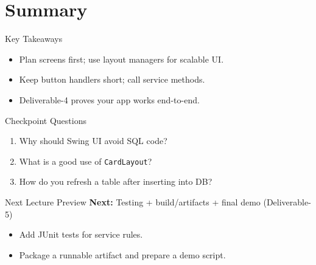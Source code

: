 \documentclass{beamer}
\begin{document}
\section{Summary}
\label{sec:summary}

\begin{frame}{Key Takeaways}
  \begin{itemize}[<+->]
    \item Plan screens first; use layout managers for scalable UI.
    \item Keep button handlers short; call service methods.
    \item Deliverable-4 proves your app works end-to-end.
  \end{itemize}
  \slidesources{\OOPSUnitVISources}
\end{frame}

\begin{frame}{Checkpoint Questions}
  \begin{enumerate}[<+->]
    \item Why should Swing UI avoid SQL code?
    \item What is a good use of \texttt{CardLayout}?
    \item How do you refresh a table after inserting into DB?
  \end{enumerate}
  \slidesources{\OOPSUnitVISources}
\end{frame}

\begin{frame}{Next Lecture Preview}
  \textbf{Next:} Testing + build/artifacts + final demo (Deliverable-5)
  \vspace{0.6em}
  \begin{itemize}[<+->]
    \item Add JUnit tests for service rules.
    \item Package a runnable artifact and prepare a demo script.
  \end{itemize}
  \slidesources{\OOPSUnitVISources}
\end{frame}
\end{document}
